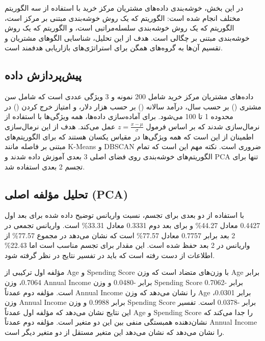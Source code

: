 \documentclass{article}
\begin{document}
در این بخش، خوشه‌بندی داده‌های مشتریان مرکز خرید با استفاده از سه الگوریتم مختلف انجام شده است: الگوریتم  که یک روش خوشه‌بندی مبتنی بر مرکز است، الگوریتم  که یک روش خوشه‌بندی سلسله‌مراتبی است، و الگوریتم  که یک روش خوشه‌بندی مبتنی بر چگالی است. هدف از این تحلیل، شناسایی الگوهای مشتریان و تقسیم آن‌ها به گروه‌های همگن برای استراتژی‌های بازاریابی هدفمند است.

\subsection{پیش‌پردازش داده}

داده‌های مشتریان مرکز خرید شامل 200 نمونه و 3 ویژگی عددی است که شامل سن مشتری () بر حسب سال، درآمد سالانه () بر حسب هزار دلار، و امتیاز خرج کردن () در محدوده 1 تا 100 می‌شود. برای آماده‌سازی داده‌ها، همه ویژگی‌ها با استفاده از  نرمال‌سازی شدند که بر اساس فرمول $z = \frac{x - \mu}{\sigma}$ عمل می‌کند. هدف از این نرمال‌سازی اطمینان از این است که همه ویژگی‌ها در مقیاس یکسان هستند که برای الگوریتم‌های مبتنی بر فاصله مانند K-Means و DBSCAN ضروری است. نکته مهم این است که تمام الگوریتم‌های خوشه‌بندی روی فضای اصلی 3 بعدی آموزش داده شدند و PCA تنها برای تجسم 2 بعدی استفاده شد.

\subsection{تحلیل مؤلفه اصلی (PCA)}

با استفاده از  دو بعدی برای تجسم، نسبت واریانس توضیح داده شده برای بعد اول 0.4427 معادل 44.27\% و برای بعد دوم 0.3331 معادل 33.31\% است. واریانس تجمعی در 2 بعد برابر 0.7757 معادل 77.57\% است که نشان می‌دهد در مجموع 77.57\% از واریانس در 2 بعد حفظ شده است. این مقدار برای تجسم مناسب است اما 22.43\% اطلاعات از دست رفته است که باید در تفسیر نتایج در نظر گرفته شود.

مؤلفه اول ترکیبی از Age و Spending Score با وزن‌های متضاد است که وزن Age برابر 0.7064، وزن Annual Income برابر -0.0480 و وزن Spending Score برابر -0.7062 است. مؤلفه دوم عمدتاً Annual Income را نشان می‌دهد که وزن Age برابر 0.0301، وزن Annual Income برابر 0.9988 و وزن Spending Score برابر -0.0378 است. تفسیر این نتایج نشان می‌دهد که مؤلفه اول عمدتاً Age و Spending Score را جدا می‌کند که نشان‌دهنده همبستگی منفی بین این دو متغیر است. مؤلفه دوم عمدتاً Annual Income را نشان می‌دهد که نشان می‌دهد این متغیر مستقل از دو متغیر دیگر است.
\end{document}
